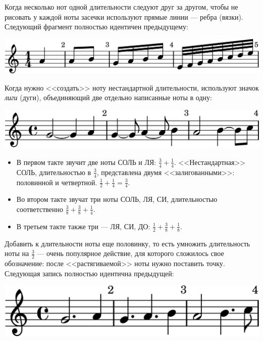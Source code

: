 Когда несколько нот одной длительности следуют друг за другом, чтобы не рисовать у каждой ноты засечки используют прямые линии --- ребра (вязки). Следующий фрагмент полностью идентичен предыдущему:
\begin{center}    
    \includegraphics{fig/notes/time-1-4-beam-on}
\end{center}

Когда нужно <<создать>> ноту нестандартной длительности, используют значок \emph{лиги} (дуги), объединяющий две отдельно написанные ноты в одну:
\begin{center}    
    \includegraphics{fig/notes/tie}
\end{center}

\begin{itemize}
    \item В первом такте звучит две ноты СОЛЬ и ЛЯ: $\frac{3}{4} + \frac{1}{4}$. <<Нестандартная>> СОЛЬ, длительностью в $\frac{3}{4}$, представлена двумя <<залигованными>>: половинной и четвертной. $\frac{1}{2}+\frac{1}{4} = \frac{3}{4}$.
    
    \item Во втором такте звучат три ноты СОЛЬ, ЛЯ, СИ, длительностью соответственно $\frac{3}{8} + \frac{3}{8} + \frac{1}{4}$.
    
    \item В третьем такте также три --- ЛЯ, СИ, ДО: $\frac{1}{2} + \frac{3}{8} + \frac{1}{8}$. 
\end{itemize}

Добавить к длительности ноты еще половинку, то есть умножить длительность ноты на $\frac{3}{2}$ --- очень популярное действие, для которого сложилось свое обозначение: после <<растягиваемой>> ноты нужно поставить точку. Следующая запись полностью идентична предыдущей:
\begin{center}    
    \includegraphics{fig/notes/point}
\end{center}

